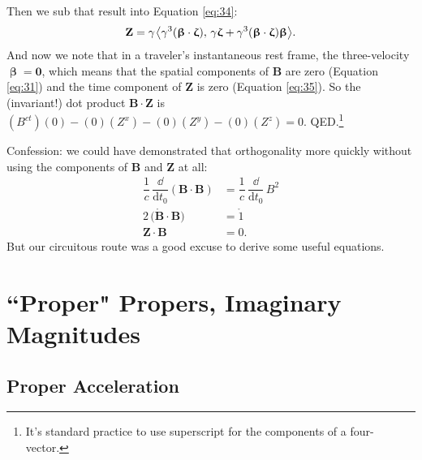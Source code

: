 \documentclass[12pt]{article}
\renewcommand{\vv}[1]{\mathbf{#1}}
\newcommand{\dd}[1]{\mathrm{d}#1}
\newcommand{\vvbeta}{\bm{\upbeta}}
\newcommand{\vvzeta}{\bm{\upzeta}}
\begin{document}
Then we sub that result into Equation \ref{eq:34}:
\begin{equation}\label{eq:35}
\vv Z =\gamma \mkern1.5mu \big \langle \gamma^3 (\vvbeta \cdot \vvzeta), \, \gamma \vvzeta + \gamma^3 (\vvbeta \cdot \vvzeta) \vvbeta \big \rangle.
\end{equation}
And now we note that in a traveler's instantaneous rest frame, the three-velocity $\vvbeta = \vv 0$, which means that the spatial components of $\vv B$ are zero (Equation \ref{eq:31}) and the time component of $\vv Z$ is zero (Equation \ref{eq:35}). So the (invariant!) dot product $\vv B \cdot \vv Z$ is $(B^{ct})(0) - (0)(Z^x) - (0)(Z^y) - (0)(Z^z) = 0$. QED.\footnote{It's standard practice to use superscript for the components of a four-vector.}

Confession: we could have demonstrated that orthogonality more quickly without using the components of $\vv B$ and $\vv Z$ at all:
\begin{equation*}
\begin{split}
\dfrac{1}{c} \, \dfrac{\dd}{\dd t_0} \left( \vv B \cdot \vv B \right) &= \dfrac{1}{c} \, \dfrac{\dd}{\dd t_0} \, B^2 \\[2pt]
2 \, \big( \mathring{\vv B} \cdot \vv B \big) &= \mathring{1} \\[3pt]
\vv Z \cdot \vv B &= 0 .
\end{split}
\end{equation*}
But our circuitous route was a good excuse to derive some useful equations.


\section["Proper" Propers, Imaginary Magnitudes]{``Proper" Propers, Imaginary Magnitudes}

\subsection{Proper Acceleration}\label{ssec:pa}
\end{document}
